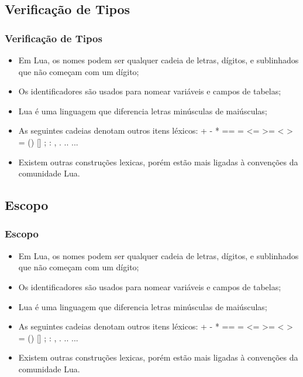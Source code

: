 \documentclass{beamer}
\begin{document}
\subsection{Verificação de Tipos}
\begin{frame}[fragile]
\frametitle{Verificação de Tipos}
	\begin{itemize}
	\item Em Lua, os nomes podem ser qualquer cadeia de letras, dígitos, e sublinhados que não começam com um dígito; 
	\item Os identificadores são usados para nomear variáveis e campos de tabelas;
	\item Lua é uma linguagem que diferencia letras minúsculas de maiúsculas;
	\item As seguintes cadeias denotam outros itens léxicos: + - * == = <= >= < > = () [] ; : , . .. ...
	\item Existem outras construções lexicas, porém estão mais ligadas à convenções da comunidade Lua.
	\end{itemize}
\end{frame}

\subsection{Escopo}
\begin{frame}[fragile]
\frametitle{Escopo}
	\begin{itemize}
	\item Em Lua, os nomes podem ser qualquer cadeia de letras, dígitos, e sublinhados que não começam com um dígito; 
	\item Os identificadores são usados para nomear variáveis e campos de tabelas;
	\item Lua é uma linguagem que diferencia letras minúsculas de maiúsculas;
	\item As seguintes cadeias denotam outros itens léxicos: + - * == = <= >= < > = () [] ; : , . .. ...
	\item Existem outras construções lexicas, porém estão mais ligadas à convenções da comunidade Lua.
	\end{itemize}
\end{frame}
\end{document}
